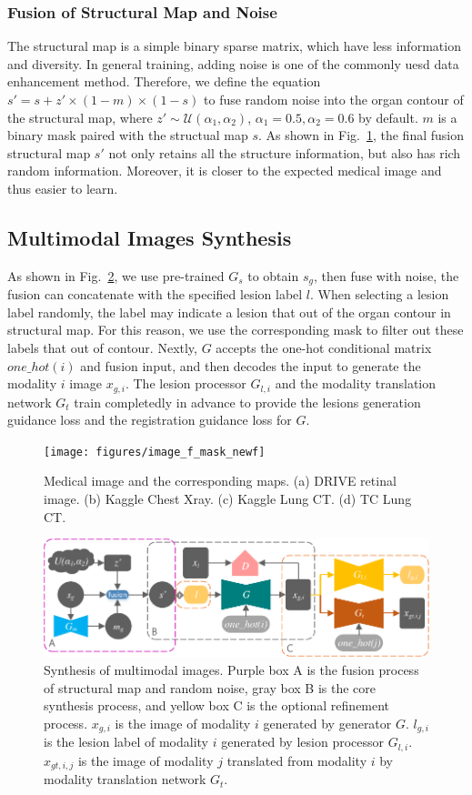\documentclass[runningheads]{llncs}
\begin{document}
	\subsubsection{Fusion of Structural Map and Noise}	
	The structural map is a simple binary sparse matrix, which have less information and diversity. In general training, adding noise is one of the commonly uesd data enhancement method. Therefore, we define the equation $s'=s+z'\times(1-m)\times(1-s)$ to fuse random noise into the organ contour of the structural map, where $z'\sim\mathcal{U}(\alpha_1,\alpha_2)$, $\alpha_1 =0.5,\alpha_2=0.6$ by default. $m$ is a binary mask paired with the structual map $s$. As shown in Fig.~\ref{image_and_f}, the final fusion structural map $s'$ not only retains all the structure information, but also has rich random information. Moreover, it is closer to the expected medical image and thus easier to learn. 	
	\subsection{Multimodal Images Synthesis}
	As shown in Fig.~\ref{mm_mri_generate}, we use pre-trained $G_s$ to obtain $s_g$, then fuse with noise, the fusion can concatenate with the specified lesion label $l$. When selecting a lesion label randomly, the label may indicate a lesion that out of the organ contour in structural map. For this reason, we use the corresponding mask to filter out these labels that out of contour. Nextly, $G$ accepts the one-hot conditional matrix $one\_hot(i)$ and fusion input, and then decodes the input to generate the modality $i$ image $x_{g,i}$. The lesion processor $G_{l,i}$ and the modality translation network $G_t$ train completedly in advance to provide the lesions generation guidance loss and the registration guidance loss for $G$.
	\begin{figure}[th]
		\centering
		\texttt{[image: figures/image\_f\_mask\_newf]}
		\caption{Medical image and the corresponding maps. (a) DRIVE retinal image. (b) Kaggle Chest Xray. (c) Kaggle Lung CT. (d) TC Lung CT.}
		\label{image_and_f}
	\end{figure}
	\begin{figure}[th]
		\centering
		\includegraphics[width=1\columnwidth]{figures/mm_mri_generate_train}
		\caption{Synthesis of multimodal images. Purple box A is the fusion process of structural map and random noise, gray box B is the core synthesis process, and yellow box C is the optional refinement process. 
			$x_{g,i}$ is the image of modality $i$ generated by generator $G$. 
			$l_{g,i}$ is the lesion label of modality $i$ generated by lesion processor $G_{l,i}$.
			$x_{gt,i,j}$ is the image of modality $j$ translated from modality $i$ by modality translation network $G_t$.
		}
		\label{mm_mri_generate}
	\end{figure}
	
\end{document}
